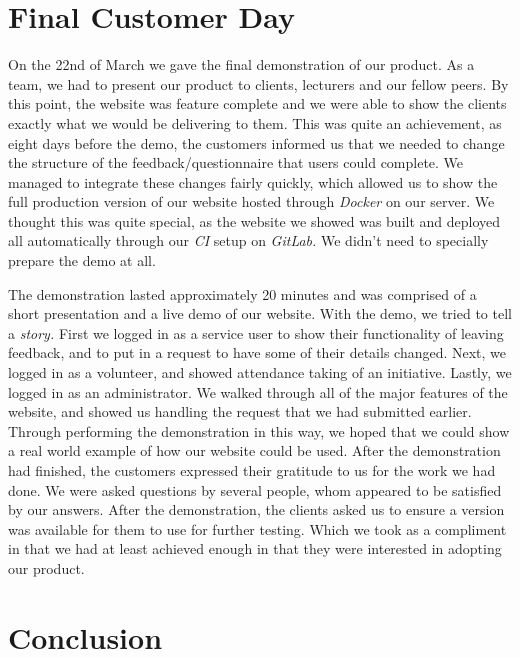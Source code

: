 \documentclass{l3proj}
\begin{document}
\section{Final Customer Day}
\label{sec:finalDay}

On the 22nd of March we gave the final demonstration of our product. As a team, we had to present our product to clients, lecturers and our fellow peers. By this point, the website was feature complete and we were able to show the clients exactly what we would be delivering to them. This was quite an achievement, as eight days before the demo, the customers informed us that we needed to change the structure of the feedback/questionnaire that users could complete. We managed to integrate these changes fairly quickly, which allowed us to show the full production version of our website hosted through \textit{Docker} on our server. We thought this was quite special, as the website we showed was built and deployed all automatically through our \textit{CI} setup on \textit{GitLab.} We didn't need to specially prepare the demo at all.

The demonstration lasted approximately 20 minutes and was comprised of a short presentation and a live demo of our website. With the demo, we tried to tell a \textit{story.} First we logged in as a service user to show their functionality of leaving feedback, and to put in a request to have some of their details changed. Next, we logged in as a volunteer, and showed attendance taking of an initiative. Lastly, we logged in as an administrator. We walked through all of the major features of the website, and showed us handling the request that we had submitted earlier. Through performing the demonstration in this way, we hoped that we could show a real world example of how our website could be used. After the demonstration had finished, the customers expressed their gratitude to us for the work we had done. We were asked questions by several people, whom appeared to be satisfied by our answers. After the demonstration, the clients asked us to ensure a version was available for them to use for further testing. Which we took as a compliment in that we had at least achieved enough in that they were interested in adopting our product.

\section{Conclusion}
\end{document}

